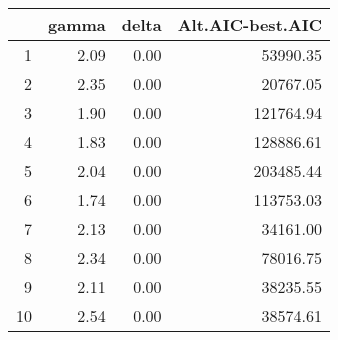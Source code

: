 \begin{table}[ht]
\centering
\begin{tabular}{rrrr}
  \hline
 & gamma & delta & Alt.AIC-best.AIC \\ 
  \hline
1 & 2.09 & 0.00 & 53990.35 \\ 
  2 & 2.35 & 0.00 & 20767.05 \\ 
  3 & 1.90 & 0.00 & 121764.94 \\ 
  4 & 1.83 & 0.00 & 128886.61 \\ 
  5 & 2.04 & 0.00 & 203485.44 \\ 
  6 & 1.74 & 0.00 & 113753.03 \\ 
  7 & 2.13 & 0.00 & 34161.00 \\ 
  8 & 2.34 & 0.00 & 78016.75 \\ 
  9 & 2.11 & 0.00 & 38235.55 \\ 
  10 & 2.54 & 0.00 & 38574.61 \\ 
   \hline
\end{tabular}
\end{table}
